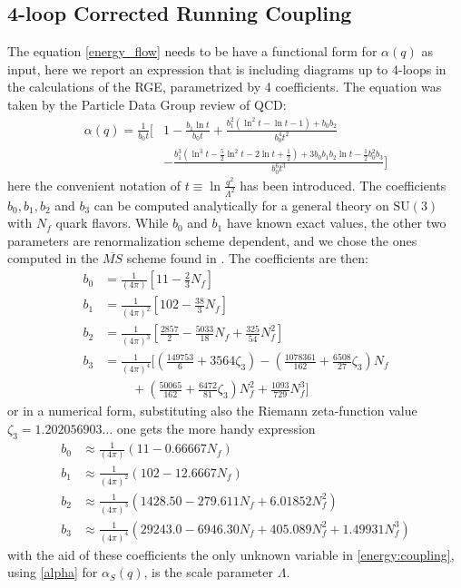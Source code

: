 \subsection{4-loop Corrected Running Coupling}
\label{sec:4loop}
The equation \cref{energy_flow} needs to be have a functional form for $\alpha(q)$ as input, here we report an expression that is including diagrams up to 4-loops in the calculations of the RGE, parametrized by 4 coefficients. The equation was taken by the Particle Data Group review of QCD\cite{dissertori_9._2016-1}:
\begin{align}
    \label{alpha}
    \alpha(q) = \frac{1}{b_0t} \bigg[& 1 - \frac{b_1\ln t}{b_0t}  + \frac{b_1^2(\ln^2t - \ln t - 1) + b_0b_2}{b_0^4t^2}\\\nonumber
    & - \frac{b_1^3(\ln^3t - \frac{5}{2}\ln^2 t - 2\ln t + \frac{1}{2}) + 3b_0b_1b_2\ln t - \frac{1}{2}b_0^2b_3}{b_0^6t^3}\bigg]
\end{align}
here the convenient notation of $t\equiv\ln\frac{q^2}{\Lambda^2}$ has been introduced. The coefficients $b_0, b_1,b_2$ and $b_3$ can be computed analytically for a general theory on $\mathrm{SU}(3)$ with $N_f$ quark flavors. While $b_0$ and $b_1$ have known exact values, the other two parameters are renormalization scheme dependent, and we chose the ones computed in the $\overline{MS}$ scheme found in \cite{van_ritbergen_four-loop_1997}. The coefficients are then: 
\begin{align}
    b_0 &= \frac{1}{(4\pi)}   \left[11 - \frac{2}{3}N_f\right] \\\nonumber
    b_1 &= \frac{1}{(4\pi)^2} \left[102 - \frac{38}{3}N_f\right] \\\nonumber
    b_2 &= \frac{1}{(4\pi)^3} \left[\frac{2857}{2} - \frac{5033}{18}N_f + \frac{325}{54}N_f^2\right] \\\nonumber
    b_3 &= \frac{1}{(4\pi)^4} \bigg[\left(\frac{149753}{6} + 3564\zeta_3\right)  - \left(\frac{1078361}{162}+ \frac{6508}{27}\zeta_3\right) N_f  \\\nonumber
    & ~~~~~~~~~~+ \left(\frac{50065}{162}  + \frac{6472}{81}\zeta_3\right)N_f^2 + \frac{1093}{729}N_f^3 \bigg] 
\end{align} 
or in a numerical form, substituting also the Riemann zeta-function value $\zeta_3 = 1.202056903\dots$ one gets the more handy expression
\begin{align}
    \label{b:coeffs}
    b_0 &\approx \frac{1}{(4\pi)} (11-0.66667N_f)\\\nonumber
    b_1 &\approx \frac{1}{(4\pi)^2} (102-12.6667N_f)\\\nonumber
    b_2 &\approx \frac{1}{(4\pi)^3} (1428.50-279.611N_f+ 6.01852N_f^2)\\\nonumber
    b_3 &\approx \frac{1}{(4\pi)^4} (29243.0-6946.30N_f+ 405.089N_f^2+ 1.49931N_f^3)
\end{align}
with the aid of these coefficients the only unknown variable in \cref{energy:coupling}, using \cref{alpha} for $\alpha_S(q)$, is the scale parameter $\Lambda$.